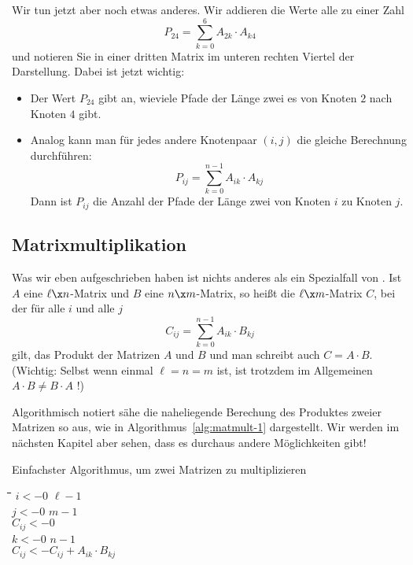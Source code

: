 \noindent
Wir tun jetzt aber noch etwas anderes. Wir addieren die Werte alle zu
einer Zahl
\[
P_{24} = \sum_{k=0}^{6} A_{2k}\cdot A_{k4}
\]
und notieren Sie in einer dritten Matrix im unteren rechten Viertel
der Darstellung.  Dabei ist jetzt wichtig:
\begin{itemize}
\item Der Wert $P_{24}$ gibt an, wieviele Pfade der Länge zwei es von
  Knoten $2$ nach Knoten $4$ gibt.
\item Analog kann man für jedes andere Knotenpaar $(i,j)$ die gleiche
  Berechnung durchführen:
  \[
  P_{ij} = \sum_{k=0}^{n-1} A_{ik}\cdot A_{kj}
  \]
  Dann ist $P_{ij}$ die Anzahl der Pfade der Länge zwei von Knoten $i$
  zu Knoten $j$.
\end{itemize}

\Tut\subsection{Matrixmultiplikation}
\label{sub:matmult}

Was wir eben aufgeschrieben haben ist nichts anderes als ein
Spezialfall von
. Ist $A$
eine $\ell\x n$-Matrix und $B$ eine $n\x m$-Matrix, so heißt die $\ell\x
m$-Matrix $C$, bei der für alle $i$ und alle $j$ 
\[
C_{ij} = \sum_{k=0}^{n-1} A_{ik}\cdot B_{kj}
\]
gilt, das Produkt der Matrizen $A$ und $B$ und man schreibt auch
$C=A\cdot B$. (Wichtig: Selbst wenn einmal $\ell=n=m$ ist, ist trotzdem
im Allgemeinen $A\cdot B \not= B \cdot A$ !)

Algorithmisch notiert sähe die naheliegende Berechung des Produktes
zweier Matrizen so aus, wie in Algorithmus~\ref{alg:matmult-1}
dargestellt. Wir werden im nächsten Kapitel aber sehen, dass es
durchaus andere Möglichkeiten gibt!

\begin{algorithm}[t]
  \caption{Einfachster Algorithmus, um zwei Matrizen zu multiplizieren}
  \label{alg:matmult-1}
  \begin{tabbing}
    \quad\=\quad\=\quad\=\quad\=\quad\=\hspace*{30mm}\=\kill
    \> $i <- 0$  $\ell-1$ \\
    \>\> $j <- 0$  $m-1$   \\
    \>\>\>$C_{ij} <- 0$ \\
    \>\>\> $k <- 0$  $n-1$   \\
    \>\>\>\>$C_{ij} <- C_{ij} + A_{ik} \cdot B_{kj}$ \\
    \>\>\> \\
    \>\> \\
    \> 
  \end{tabbing}
\end{algorithm}

